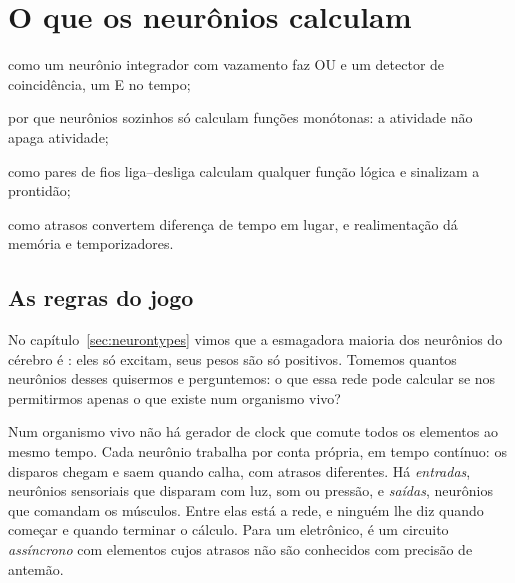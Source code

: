 \chapter{O que os neurônios  calculam}
\label{sec:glutcomputer}
\begin{chaptergoals}
\item como um neurônio integrador com vazamento faz OU e um detector de coincidência, um E no tempo;
\item por que neurônios  sozinhos só calculam funções monótonas: a atividade não apaga atividade;
\item como pares de fios liga--desliga calculam qualquer função lógica e sinalizam a prontidão;
\item como atrasos convertem diferença de tempo em lugar, e realimentação dá memória e temporizadores.
\end{chaptergoals}

\section{As regras do jogo}

No capítulo~\ref{sec:neurontypes} vimos que a esmagadora maioria dos neurônios do cérebro é : eles só excitam, seus pesos são só positivos. Tomemos quantos neurônios desses quisermos e perguntemos: o que essa rede pode calcular se nos permitirmos apenas o que existe num organismo vivo?

Num organismo vivo não há gerador de clock que comute todos os elementos ao mesmo tempo. Cada neurônio trabalha por conta própria, em tempo contínuo: os disparos chegam e saem quando calha, com atrasos diferentes. Há \emph{entradas}, neurônios sensoriais que disparam com luz, som ou pressão, e \emph{saídas}, neurônios que comandam os músculos. Entre elas está a rede, e ninguém lhe diz quando começar e quando terminar o cálculo. Para um eletrônico, é um circuito \emph{assíncrono} com elementos cujos atrasos não são conhecidos com precisão de antemão.

